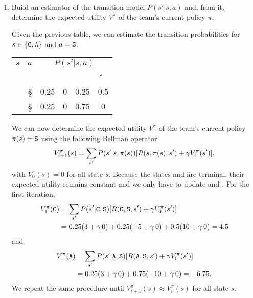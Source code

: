\documentclass[11pt, a4paper]{article}
\begin{document}
\begin{enumerate}
    \item Build an estimator of the transition model $P(s' | s, a)$ and, from it, determine the expected utility $V^\pi$ of the team's current policy $\pi$.
    \begin{solution}
        Given the previous table, we can estimate the transition probabilities for $s \in \cbk{\C, \A}$ and $a = \S$.

        \begin{table}[h]
            \centering
            \begin{tabular}{cc|cccc}
                \toprule
                 $s$ & $a$ & \multicolumn{4}{c}{$P(s' | s, a)$} \\
                     &     & \C & \A & \F & \G \\
                 \midrule
                 \C & \S & $0.25$ & $0$ & $0.25$ & $0.5$ \\
                 \A & \S & $0.25$ & $0$ & $0.75$ & $0$ \\
                 \bottomrule
            \end{tabular}
        \end{table}

        We can now determine the expected utility $V^\pi$ of the team's current policy $\pi(s) = \S$ using the following Bellman operator
        \begin{equation*}
            V_{i + 1}^\pi(s) = \sum_{s'} P(s' | s, \pi(s)) \sbk*{R(s, \pi(s), s') + \gamma V_i^\pi(s')} ,
        \end{equation*}
        with $V_0^\pi(s) = 0$ for all state $s$. Because the states \F and \G are terminal, their expected utility remains constant and we only have to update \C and \A. For the first iteration,
        \begin{align*}
            V_1^\pi(\C) & = \sum_{s'} P(s' | \C, \S) \sbk*{R(\C, \S, s') + \gamma V_0^\pi(s')} \\
            & = 0.25 (3 + \gamma \, 0) + 0.25 (-5 + \gamma \, 0) + 0.5 (10 + \gamma \, 0) = 4.5
        \end{align*}
        and
        \begin{align*}
            V_1^\pi(\A) & = \sum_{s'} P(s' | \A, \S) \sbk*{R(\A, \S, s') + \gamma V_0^\pi(s')} \\
            & = 0.25 (3 + \gamma \, 0) + 0.75 (-10 + \gamma \, 0) = -6.75 .
        \end{align*}
        We repeat the same procedure until $V_{i + 1}^\pi(s) \approx V_i^\pi(s)$ for all state $s$.


\end{solution}
\end{enumerate}
\end{document}
